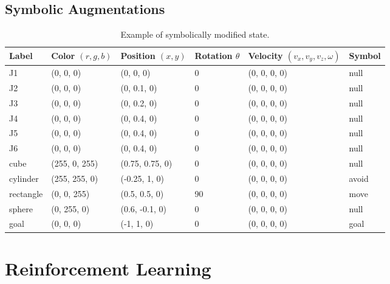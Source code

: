 \subsection{Symbolic Augmentations}
\begin{table}
	\begin{tiny}
		\begin{center}
			\begin{tabular}{ | m{1cm} | m{1.75cm}| m{2cm} | m{1.5cm} | m{3cm} | m{1cm} | }
				\hline
				\textbf{Label} & \textbf{Color $(r, g, b)$} & \textbf{Position $(x,y)$} & \textbf{Rotation $\theta$} & \textbf{Velocity $(v_x, v_y, v_z, \omega)$} & \textbf{Symbol} \\
				\hline
				J1 & (0, 0, 0) & (0, 0, 0) & 0\textdegree & (0, 0, 0, 0) & null \\ 
				\hline
				J2 & (0, 0, 0) & (0, 0.1, 0) & 0\textdegree & (0, 0, 0, 0) & null\\ 
				\hline
				J3 & (0, 0, 0) & (0, 0.2, 0) & 0\textdegree & (0, 0, 0, 0) & null\\ 
				\hline
				J4 & (0, 0, 0) & (0, 0.4, 0) & 0\textdegree & (0, 0, 0, 0) & null\\ 
				\hline
				J5 & (0, 0, 0) & (0, 0.4, 0) & 0\textdegree & (0, 0, 0, 0) & null \\ 
				\hline
				J6 & (0, 0, 0) & (0, 0.4, 0) & 0\textdegree & (0, 0, 0, 0)& null \\ 
				\hline
				cube & (255, 0, 255) & (0.75, 0.75, 0) & 0\textdegree & (0, 0, 0, 0) & null\\ 
				\hline
				cylinder & (255, 255, 0) & (-0.25, 1, 0) & 0\textdegree & (0, 0, 0, 0) & avoid\\ 
				\hline
				rectangle & (0, 0, 255) & (0.5, 0.5, 0) & 90\textdegree & (0, 0, 0, 0) & move\\ 
				\hline
				sphere & (0, 255, 0) & (0.6, -0.1, 0) & 0\textdegree & (0, 0, 0, 0) & null\\ 
				\hline
				goal & (0, 0, 0) & (-1, 1, 0) & 0\textdegree & (0, 0, 0, 0) & goal\\ 
				\hline
			\end{tabular}
		\end{center}
	\end{tiny}
	\caption{Example of symbolically modified state.}
	\label{tab:symbolic_state}
\end{table}





\section{Reinforcement Learning}
